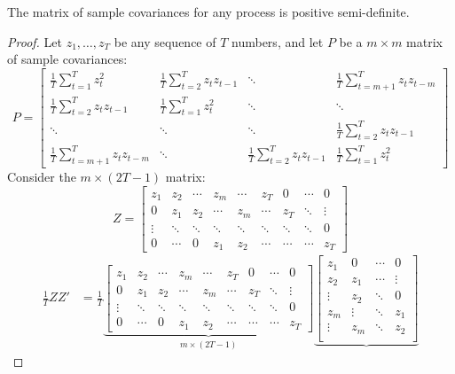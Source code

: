 \documentclass[DIV=14,titlepage=false]{scrreprt}
\begin{document}
\begin{lemma}
    The matrix of sample covariances for any process is positive semi-definite.
\end{lemma}
\begin{proof}
    Let $z_1, \dots, z_T$ be any sequence of $T$ numbers, and let $P$ be a $m\times m$ matrix of sample covariances:
    \[ P=
    \begin{bmatrix}
        \frac{1}{T} \sum_{t=1}^{T}z_t^2 & \frac{1}{T} \sum_{t=2}^{T}z_tz_{t-1} & \ddots & \frac{1}{T}\sum_{t=m+1}^{T}z_tz_{t-m}\\
        \frac{1}{T} \sum_{t=2}^{T}z_tz_{t-1} & \frac{1}{T} \sum_{t=1}^{T}z_t^2 & \ddots & \ddots\\
        \ddots & \ddots & \ddots & \frac{1}{T} \sum_{t=2}^{T}z_tz_{t-1}\\
        \frac{1}{T}\sum_{t=m+1}^{T}z_tz_{t-m} & \ddots & \frac{1}{T} \sum_{t=2}^{T}z_tz_{t-1} &  \frac{1}{T} \sum_{t=1}^{T}z_t^2
    \end{bmatrix}\]
    Consider the $m \times (2T-1)$ matrix:
    \[
    Z= \begin{bmatrix}
        z_1&z_2&\cdots&z_m&\cdots&z_T&0&\cdots&0\\
        0&z_1&z_2&\cdots&z_m&\cdots&z_T&\ddots&\vdots\\
        \vdots & \ddots&\ddots&\ddots&\ddots&\ddots&\ddots&\ddots&0\\
        0&\cdots&0&z_1&z_2&\cdots&\cdots&\cdots&z_T
    \end{bmatrix}    
    \]
    \begin{align*}
         \frac{1}{T}ZZ' &= \frac{1}{T}
         \underbrace{\begin{bmatrix}
            z_1&z_2&\cdots&z_m&\cdots&z_T&0&\cdots&0\\
            0&z_1&z_2&\cdots&z_m&\cdots&z_T&\ddots&\vdots\\
            \vdots & \ddots&\ddots&\ddots&\ddots&\ddots&\ddots&\ddots&0\\
            0&\cdots&0&z_1&z_2&\cdots&\cdots&\cdots&z_T
        \end{bmatrix}}_{m\times(2T-1)}
        \underbrace{\begin{bmatrix}
            z_1 & 0 & \cdots & 0 \\
            z_2 & z_1 & \cdots & \vdots \\
            \vdots & z_2 & \ddots & 0 \\
            z_m & \vdots & \ddots & z_1 \\
            \vdots & z_m & \ddots & z_2 \\

\end{bmatrix}}
\end{align*}
\end{proof}
\end{document}

